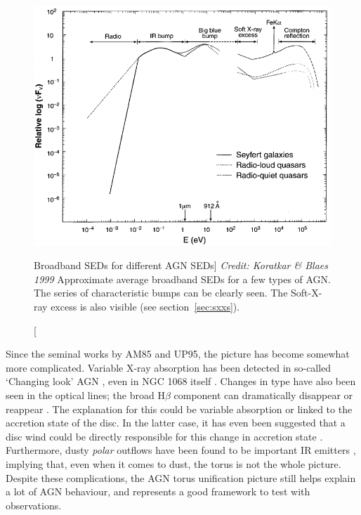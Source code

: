 \nocite{elvis1994}
\begin{figure}
\centering
\includegraphics[width=1.0\textwidth]{figures/01-intro/agn_sed.png}
\caption
[Broadband SEDs for different AGN SEDs]
{
{\sl Credit: Koratkar \& Blaes 1999}
Approximate average broadband SEDs for a few types of AGN. The series of 
characteristic bumps can be clearly seen. 
The Soft-X-ray excess is also visible
(see section~\ref{sec:sxxs}).
} 
\label{fig:quasar_sed}
\end{figure}

Since the seminal works by AM85 and UP95, 
the picture has become somewhat more complicated. 
Variable X-ray absorption has been detected in so-called `Changing look'
AGN \citep{matt2003,puccetti2007}, even in NGC 1068 itself \citep{marinucci2016}.
Changes in type have also been seen in the optical lines; 
the broad H$\beta$ component can dramatically disappear or reappear
\citep[e.g.][]{tohline1976,cohen1986,denney2014}. 
The explanation for this could be variable absorption \citep{elitzur2012}
or linked to the accretion state of the disc. In the latter case,
it has even been suggested that a disc wind could be directly responsible
for this change in accretion state \citep{elitzur2014}.
Furthermore, dusty {\em polar} outflows
have been found to be important IR emitters \citep{hoenig2013}, implying
that, even when it comes to dust, the torus is not the whole picture.
Despite these complications, the AGN torus unification picture still helps 
explain a lot of AGN behaviour, and represents a good framework 
to test with observations. 


